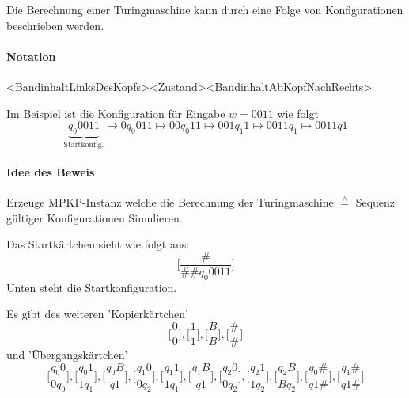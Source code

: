 \par\medskip Die Berechnung einer Turingmaschine kann durch eine Folge von Konfigurationen beschrieben werden.

\paragraph*{Notation} <BandinhaltLinksDesKopfs><Zustand><BandinhaltAbKopfNachRechts>

\par\medskip Im Beispiel ist die Konfiguration für Eingabe $w=0011$ wie folgt $$ \underbrace{q_0 0011}_{\text{Startkonfig.}} \mapsto 0 q_0 011 \mapsto 00q_0 11 \mapsto 001q_1 1 \mapsto 0011q_1 \mapsto 0011\overline{q}1 $$

\paragraph*{Idee des Beweis} Erzeuge MPKP-Instanz welche die Berechnung der Turingmaschine $\overset{\wedge}{=}$ Sequenz gültiger Konfigurationen Simulieren.

\par\medskip Das Startkärtchen sieht wie folgt aus: $$\Big[ \frac{\#}{\#\#q_0 0011} \Big]$$ Unten steht die Startkonfiguration.

\par\medskip Es gibt des weiteren 'Kopierkärtchen' $$\Big[ \frac{0}{0} \Big], \Big[ \frac{1}{1} \Big], \Big[ \frac{B}{B} \Big], \Big[ \frac{\#}{\#} \Big]$$ und 'Übergangskärtchen' $$\Big[ \frac{q_0 0}{0q_0} \Big], \Big[ \frac{q_0 1}{1q_1} \Big], \Big[ \frac{q_0 B}{\overline{q}1} \Big], \Big[ \frac{q_1 0}{0q_2} \Big], \Big[ \frac{q_1 1}{1q_1} \Big], \Big[ \frac{q_1 B}{\overline{q}1} \Big], \Big[ \frac{q_2 0}{0q_2} \Big], \Big[ \frac{q_2 1}{1q_2} \Big], \Big[ \frac{q_2 B}{Bq_2} \Big], \Big[ \frac{q_0\#}{\overline{q}1\#} \Big], \Big[ \frac{q_1\#}{\overline{q}1\#} \Big]$$


